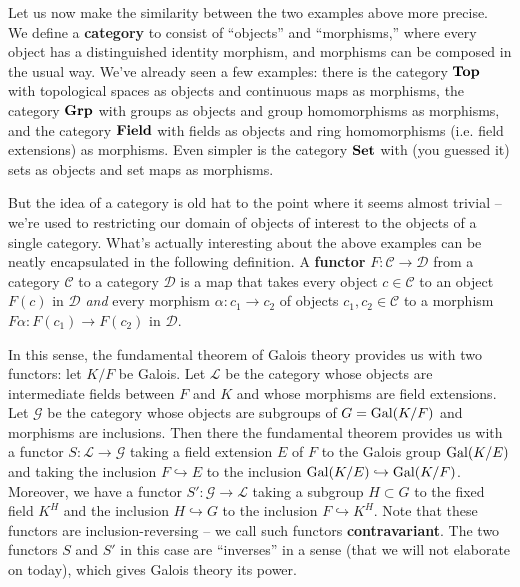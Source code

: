 \documentclass{../../mathnotes}
\begin{document}
Let us now make the similarity between the two examples above more precise. We define a \textbf{category} to consist
of ``objects'' and ``morphisms,'' where every object has a distinguished identity morphism, and morphisms can be composed 
in the usual way. We've already seen a few examples: there is the category ${ \normalfont\textbf{Top}}$ with topological spaces as
objects and continuous maps as morphisms, the category ${ \normalfont\textbf{Grp}}$ with groups as objects and group homomorphisms
as morphisms, and the category ${ \normalfont\textbf{Field}}$ with fields as objects and ring homomorphisms (i.e. field extensions)
as morphisms. Even simpler is the category ${ \normalfont\textbf{Set}}$ with (you guessed it) sets as objects and set maps as morphisms.

But the idea of a category is old hat to the point where it seems almost trivial -- we're used to restricting our domain
of objects of interest to the objects of a single category. What's actually interesting about the above examples can be neatly
encapsulated in the following definition. A \textbf{functor} $F:\mathcal{C}\to\mathcal{D}$ from a category $\mathcal{C}$ to a category
$\mathcal{D}$ is a map that takes every object $c\in\mathcal{C}$ to an object $F(c)$ in $\mathcal{D}$ \emph{and} every morphism
$\alpha:c_1\to c_2$ of objects $c_1,c_2\in\mathcal{C}$ to a morphism $F\alpha:F(c_1)\to F(c_2)$ in $\mathcal{D}$.

In this sense, the fundamental theorem of Galois theory provides us with two functors: let $K/F$ be Galois.
Let $\mathcal{L}$ be the category whose objects are intermediate fields between $F$ and $K$ and whose morphisms
are field extensions. Let $\mathcal{G}$ be the category whose objects are subgroups of $G=\operatorname{Gal}(K/F)$ and morphisms
are inclusions. Then there the fundamental theorem provides us with a functor $S:\mathcal{L}\to \mathcal{G}$ taking
a field extension $E$ of $F$ to the Galois group $\operatorname{Gal}(K/E)$ and taking the inclusion $F\hookrightarrow E$ to the
inclusion $\operatorname{Gal}(K/E)\hookrightarrow \operatorname{Gal}(K/F)$. Moreover, we have a functor $S':\mathcal{G}\to \mathcal{L}$
taking a subgroup $H\subset G$ to the fixed field $K^H$ and the inclusion $H\hookrightarrow G$ to the inclusion
$F\hookrightarrow K^H$. Note that these functors are inclusion-reversing -- we call such functors \textbf{contravariant}.
The two functors $S$ and $S'$ in this case are ``inverses'' in a sense (that we will not elaborate on today), which
gives Galois theory its power.
\end{document}
